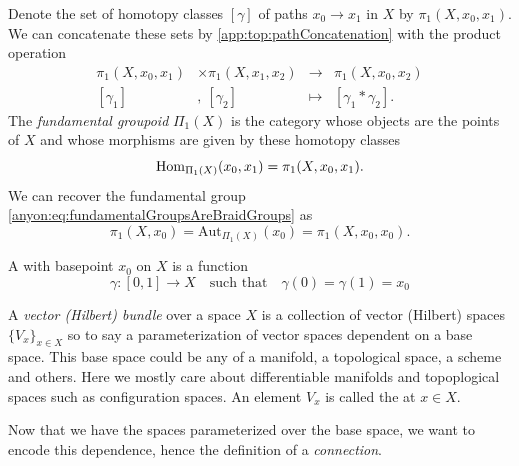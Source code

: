 \begin{definition} Denote the set of homotopy classes
  $[\gamma]$ of paths $x_0 \to x_1$ in $X$ by $\pi_1(X,x_0,x_1)$. We can
  concatenate these sets by \eqref{app:top:pathConcatenation} with the product
  operation
  \[
    \begin{alignedat}{2}
      \pi_1(X,x_0,x_1) &\times \pi_1(X,x_1,x_2)
      &\longrightarrow{}& \pi_1(X,x_0,x_2)\\
      [\gamma_1] &,\ [\gamma_2]
      &\longmapsto{}& [\gamma_1 * \gamma_2].
    \end{alignedat}
  \]
  The \emph{fundamental groupoid} $\Pi_1(X)$ is the category whose objects are
  the points of $X$ and whose morphisms are given by these homotopy classes
  \[
    \operatorname{Hom}_{\Pi_1(X)}(x_0, x_1) = \pi_1(X,x_0,x_1).
  \]
  We can recover the fundamental group
  \eqref{anyon:eq:fundamentalGroupsAreBraidGroups} as 
  \[
    \pi_1(X,x_0) = \mathrm{Aut}_{\Pi_1(X)}(x_0) = \pi_1(X,x_0,x_0).
  \]
\end{definition}

\begin{theorem}
\end{theorem}


\begin{definition}
  A \emph{} with basepoint $x_0$ on $X$ is a function
  \begin{equation}
    \gamma : [0,1] \to X \quad\text{such that}\quad \gamma(0) = \gamma(1) = x_0
  \end{equation}
\end{definition}

\begin{definition}[Bundle]
  A \emph{vector (Hilbert) bundle} over a space $X$ is a collection of vector
  (Hilbert) spaces $\{V_x\}_{x \in X}$ so to say a parameterization of vector
  spaces dependent on a base space. This base space could be any of a manifold,
  a topological space, a scheme and others. Here we mostly care about
  differentiable manifolds and topoplogical spaces such as configuration spaces.
  An element $V_x$ is called the \emph{} at $x \in X$.
\end{definition}

Now that we have the spaces parameterized over the base space, we want to encode
this dependence, hence the definition of a \emph{connection}.

